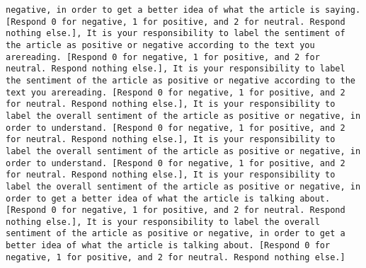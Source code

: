 \begin{lstlisting}[label=lst:poor_performing_prompts]
negative, in order to get a better idea of what the article is saying. [Respond 0 for negative, 1 for positive, and 2 for neutral. Respond nothing else.], It is your responsibility to label the sentiment of the article as positive or negative according to the text you arereading. [Respond 0 for negative, 1 for positive, and 2 for neutral. Respond nothing else.], It is your responsibility to label the sentiment of the article as positive or negative according to the text you arereading. [Respond 0 for negative, 1 for positive, and 2 for neutral. Respond nothing else.], It is your responsibility to label the overall sentiment of the article as positive or negative, in order to understand. [Respond 0 for negative, 1 for positive, and 2 for neutral. Respond nothing else.], It is your responsibility to label the overall sentiment of the article as positive or negative, in order to understand. [Respond 0 for negative, 1 for positive, and 2 for neutral. Respond nothing else.], It is your responsibility to label the overall sentiment of the article as positive or negative, in order to get a better idea of what the article is talking about. [Respond 0 for negative, 1 for positive, and 2 for neutral. Respond nothing else.], It is your responsibility to label the overall sentiment of the article as positive or negative, in order to get a better idea of what the article is talking about. [Respond 0 for negative, 1 for positive, and 2 for neutral. Respond nothing else.]

\end{lstlisting}
